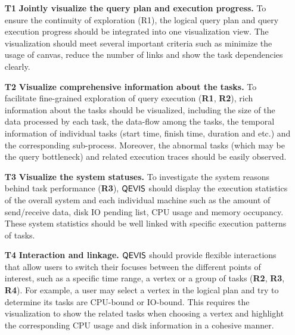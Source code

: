 \begin{itemize}
	\item[\textbf{T1}]\textbf{Jointly visualize the query plan and execution progress.} To ensure the continuity of exploration (R1), the logical query plan and query execution progress should be integrated into one visualization view. The visualization should meet several important criteria such as minimize the usage of canvas, reduce the number of links and show the task dependencies clearly.
	
	\item[\textbf{T2}]\textbf{Visualize comprehensive information about the tasks.} To facilitate fine-grained exploration of query execution (\textbf{R1}, \textbf{R2}), rich information about the tasks should be visualized, including the size of the data processed by each task, the data-flow among the tasks, the temporal information of individual tasks (start time, finish time, duration and etc.) and the corresponding sub-process. Moreover, the abnormal tasks (which may be the query bottleneck) and related execution traces should be easily observed.
	
	\item[\textbf{T3}]\textbf{Visualize the system statuses.} To investigate the system reasons behind task performance (\textbf{R3}), $\mathsf{QEVIS}$ should display the execution statistics of the overall system and each individual machine such as the amount of send/receive data, disk IO pending list, CPU usage and memory occupancy. These system statistics should be well linked with specific execution patterns of tasks. 
	
	\item[\textbf{T4}]\textbf{Interaction and linkage.} $\mathsf{QEVIS}$ should provide flexible interactions that allow users to switch their focuses between the different points of interest, such as a specific time range, a vertex or a group of tasks (\textbf{R2}, \textbf{R3}, \textbf{R4}). For example, a user may select a vertex in the logical plan and try to determine its tasks are CPU-bound or IO-bound. This requires the visualization to show the related tasks when choosing a vertex and highlight the corresponding CPU usage and disk information in a cohesive manner.
\end{itemize}


